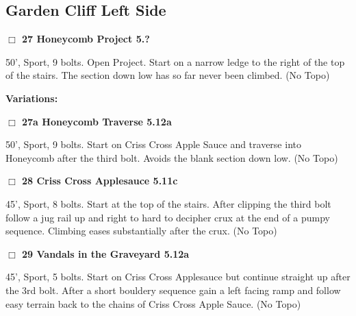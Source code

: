 \begin{multicols}{2}
\needspace{1.5cm}
\subsection*{Garden Cliff Left Side}\label{bf:Garden Cliff Left Side}
	


\needspace{1.5cm}
\label{rt:Honeycomb Project}
\colorbox{black!20}{
\parbox{0.95\linewidth}{
\hspace{-1ex}\textbf{$\Box$
27 Honeycomb Project 5.?  
}}}
\begin{adjustwidth}{1.3em}{}			
50', Sport, 9 bolts. Open Project. Start on a narrow ledge to the right of the top of the stairs. The section down low has so far never been climbed.
  (No Topo)
\end{adjustwidth}


\begin{adjustwidth}{0.5cm}{}				
\needspace{3cm}
\textbf{Variations:} \newline

\needspace{1.5cm}
\label{vr:Honeycomb Traverse}
\colorbox{Goldenrod!20}{
\parbox{0.95\linewidth}{
\hspace{-1ex}\textbf{$\Box$
27a Honeycomb Traverse 5.12a  
}}}
\begin{adjustwidth}{1.3em}{}			
50', Sport, 9 bolts. Start on Criss Cross Apple Sauce and traverse into Honeycomb after the third bolt. Avoids the blank section down low.
  (No Topo)
\end{adjustwidth}



\end{adjustwidth}


\needspace{1.5cm}
\label{rt:Criss Cross Applesauce}
\colorbox{RoyalBlue!20}{
\parbox{0.95\linewidth}{
\hspace{-1ex}\textbf{$\Box$
28 Criss Cross Applesauce 5.11c  
}}}
\begin{adjustwidth}{1.3em}{}			
45', Sport, 8 bolts. Start at the top of the stairs. After clipping the third bolt follow a jug rail up and right to hard to decipher crux at the end of a pumpy sequence. Climbing eases substantially after the crux.
  (No Topo)
\end{adjustwidth}




\needspace{1.5cm}
\label{rt:Vandals in the Graveyard}
\colorbox{Goldenrod!20}{
\parbox{0.95\linewidth}{
\hspace{-1ex}\textbf{$\Box$
29 Vandals in the Graveyard 5.12a  
}}}
\begin{adjustwidth}{1.3em}{}			
45', Sport, 5 bolts. Start on Criss Cross Applesauce but continue straight up after the 3rd bolt. After a short bouldery sequence gain a left facing ramp and follow easy terrain back to the chains of Criss Cross Apple Sauce.
  (No Topo)
\end{adjustwidth}





\end{multicols}
